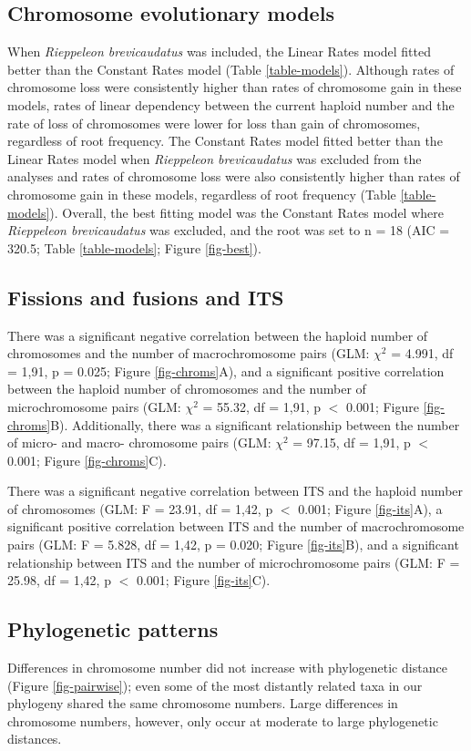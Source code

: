 \documentclass[a4paper, 12pt]{article}
\begin{document}
\subsection{Chromosome evolutionary models}
When \textit{Rieppeleon brevicaudatus} was included, the Linear Rates model fitted better than the Constant Rates model (Table \ref{table-models}).
Although rates of chromosome loss were consistently higher than rates of chromosome gain in these models, rates of linear dependency between the current haploid number and the rate of loss of chromosomes were lower for loss than gain of chromosomes, regardless of root frequency. 
The Constant Rates model fitted better than the Linear Rates model when \textit{Rieppeleon brevicaudatus} was excluded from the analyses and rates of chromosome loss were also consistently higher than rates of chromosome gain in these models, regardless of root frequency (Table \ref{table-models}). 
Overall, the best fitting model was the Constant Rates model where \textit{Rieppeleon brevicaudatus} was excluded, and the root was set to n = 18 (AIC = 320.5; Table \ref{table-models}; Figure \ref{fig-best}).

\subsection{Fissions and fusions and ITS}
There was a significant negative correlation between the haploid number of chromosomes and the number of macrochromosome pairs (GLM: $\chi^2$ = 4.991, df = 1,91, p = 0.025; Figure \ref{fig-chroms}A), and a significant positive correlation between the haploid number of chromosomes and the number of microchromosome pairs (GLM: $\chi^2$ = 55.32, df = 1,91, p $<$ 0.001; Figure \ref{fig-chroms}B). 
Additionally, there was a significant relationship between the number of micro- and macro- chromosome pairs (GLM: $\chi^2$ = 97.15, df = 1,91, p $<$ 0.001; Figure \ref{fig-chroms}C). 

There was a significant negative correlation between ITS and the haploid number of chromosomes (GLM: F = 23.91, df = 1,42, p $<$ 0.001; Figure \ref{fig-its}A), a significant positive correlation between ITS and the number of macrochromosome pairs (GLM: F = 5.828, df = 1,42, p = 0.020; Figure \ref{fig-its}B), and a significant relationship between ITS and the number of microchromosome pairs (GLM: F = 25.98, df = 1,42, p $<$ 0.001; Figure \ref{fig-its}C). 

\subsection{Phylogenetic patterns}
Differences in chromosome number did not increase with phylogenetic distance (Figure \ref{fig-pairwise}); even some of the most distantly related taxa in our phylogeny shared the same chromosome numbers. 
Large differences in chromosome numbers, however, only occur at moderate to large phylogenetic distances. 
\end{document}
